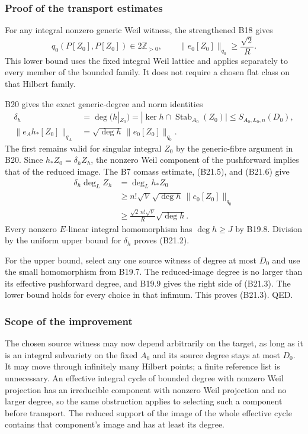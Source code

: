 \documentclass[11pt,a4paper]{article}
\theoremstyle{definition}
\begin{document}
\subsubsection{Proof of the transport estimates}\label{proof-of-the-transport-estimates}

For any integral nonzero generic Weil witness, the strengthened B18 gives \[
 q_0(P[Z_0],P[Z_0])\in2\mathbb Z_{>0},
 \qquad
 \|e_0[Z_0]\|_{q_0}\ge\frac{\sqrt2}{R}.
\tag{B21.5}
\] This lower bound uses the fixed integral Weil lattice and applies separately to every member of the bounded family. It does not require a chosen flat class on that Hilbert family.

B20 gives the exact generic-degree and norm identities \[
 \begin{aligned}
 \delta_h&=\deg(h|_{Z_0})
   =|\ker h\cap\operatorname{Stab}_{A_0}(Z_0)|
   \le S_{A_0,L_0,n}(D_0),\\
 \|e_A h_*[Z_0]\|_{q_A}
   &=\sqrt{\deg h}\,\|e_0[Z_0]\|_{q_0}.
 \end{aligned}
\tag{B21.6}
\] The first remains valid for singular integral \(Z_0\) by the generic-fibre argument in B20. Since \(h_*Z_0=\delta_h Z_h\), the nonzero Weil component of the pushforward implies that of the reduced image. The B7 comass estimate, (B21.5), and (B21.6) give \[
 \begin{aligned}
 \delta_h\deg_L Z_h
 &=\deg_L h_*Z_0\\
 &\ge n!\sqrt V\,\sqrt{\deg h}\,\|e_0[Z_0]\|_{q_0}\\
 &\ge \frac{\sqrt2\,n!\sqrt V}{R}\sqrt{\deg h}.
 \end{aligned}
\] Every nonzero \(E\)-linear integral homomorphism has \(\deg h\ge J\) by B19.8. Division by the uniform upper bound for \(\delta_h\) proves (B21.2).

For the upper bound, select any one source witness of degree at most \(D_0\) and use the small homomorphism from B19.7. The reduced-image degree is no larger than its effective pushforward degree, and B19.9 gives the right side of (B21.3). The lower bound holds for every choice in that infimum. This proves (B21.3). QED.

\subsubsection{Scope of the improvement}\label{scope-of-the-improvement}

The chosen source witness may now depend arbitrarily on the target, as long as it is an integral subvariety on the fixed \(A_0\) and its source degree stays at most \(D_0\). It may move through infinitely many Hilbert points; a finite reference list is unnecessary. An effective integral cycle of bounded degree with nonzero Weil projection has an irreducible component with nonzero Weil projection and no larger degree, so the same obstruction applies to selecting such a component before transport. The reduced support of the image of the whole effective cycle contains that component's image and has at least its degree.
\end{document}
